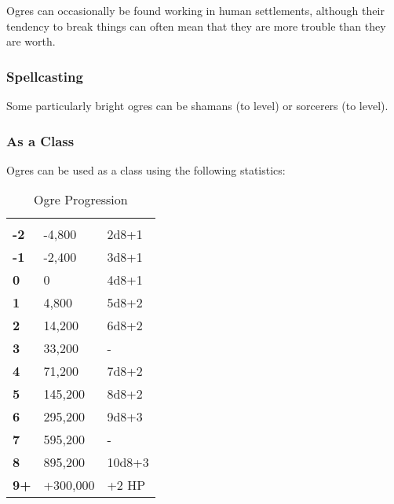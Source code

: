 \begin{multicols*}{2}
Ogres can occasionally be found working in human settlements, although their tendency to break things can often mean that they are more trouble than they are worth.

\subsubsection{Spellcasting}
Some particularly bright ogres can be shamans (to  level) or sorcerers (to  level).

\subsubsection{As a Class}
Ogres can be used as a class using the following statistics:


\begin {table}[H]
  \caption{Ogre Progression}
  \begin{tabularx}{\columnwidth}{>{\bfseries}YYY}
   &  & \\
	-2 & -4,800 & 2d8+1\\
	-1 & -2,400 & 3d8+1\\
	0 & 0 & 4d8+1\\
	1 & 4,800 & 5d8+2\\
	2 & 14,200 & 6d8+2\\
	3 & 33,200 & -\\
	4 & 71,200 & 7d8+2\\
	5 & 145,200 & 8d8+2\\
	6 & 295,200 & 9d8+3\\
	7 & 595,200 & -\\
	8 & 895,200 & 10d8+3\\
	9+ & +300,000 & +2 HP
  \end {tabularx}
\end {table}


\end{multicols*}
